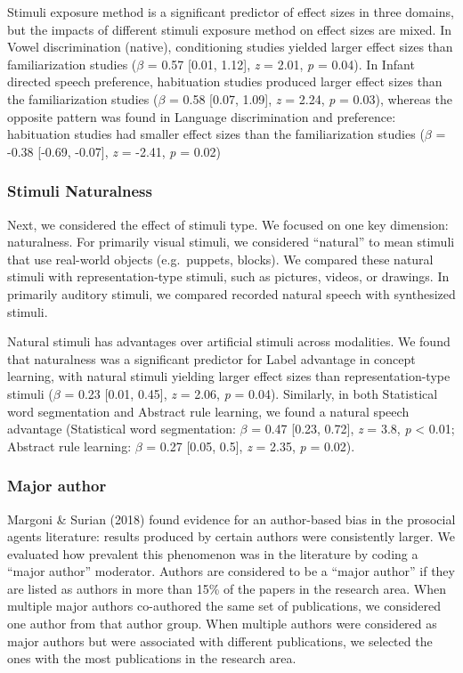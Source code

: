 \documentclass[10pt, letterpaper]{article}
\begin{document}
Stimuli exposure method is a significant predictor of effect sizes in
three domains, but the impacts of different stimuli exposure method on
effect sizes are mixed. In Vowel discrimination (native), conditioning
studies yielded larger effect sizes than familiarization studies
(\(\beta\) = 0.57 {[}0.01, 1.12{]}, \emph{z} = 2.01, \emph{p} = 0.04).
In Infant directed speech preference, habituation studies produced
larger effect sizes than the familiarization studies (\(\beta\) = 0.58
{[}0.07, 1.09{]}, \emph{z} = 2.24, \emph{p} = 0.03), whereas the
opposite pattern was found in Language discrimination and preference:
habituation studies had smaller effect sizes than the familiarization
studies (\(\beta\) = -0.38 {[}-0.69, -0.07{]}, \emph{z} = -2.41,
\emph{p} = 0.02)

\hypertarget{stimuli-naturalness}{%
\subsubsection{Stimuli Naturalness}\label{stimuli-naturalness}}

Next, we considered the effect of stimuli type. We focused on one key
dimension: naturalness. For primarily visual stimuli, we considered
``natural'' to mean stimuli that use real-world objects (e.g.~puppets,
blocks). We compared these natural stimuli with representation-type
stimuli, such as pictures, videos, or drawings. In primarily auditory
stimuli, we compared recorded natural speech with synthesized stimuli.

Natural stimuli has advantages over artificial stimuli across
modalities. We found that naturalness was a significant predictor for
Label advantage in concept learning, with natural stimuli yielding
larger effect sizes than representation-type stimuli (\(\beta\) = 0.23
{[}0.01, 0.45{]}, \emph{z} = 2.06, \emph{p} = 0.04). Similarly, in both
Statistical word segmentation and Abstract rule learning, we found a
natural speech advantage (Statistical word segmentation: \(\beta\) =
0.47 {[}0.23, 0.72{]}, \emph{z} = 3.8, \emph{p} \textless{} 0.01;
Abstract rule learning: \(\beta\) = 0.27 {[}0.05, 0.5{]}, \emph{z} =
2.35, \emph{p} = 0.02).

\hypertarget{major-author}{%
\subsubsection{Major author}\label{major-author}}

Margoni \& Surian (2018) found evidence for an author-based bias in the
prosocial agents literature: results produced by certain authors were
consistently larger. We evaluated how prevalent this phenomenon was in
the literature by coding a ``major author'' moderator. Authors are
considered to be a ``major author'' if they are listed as authors in
more than 15\% of the papers in the research area. When multiple major
authors co-authored the same set of publications, we considered one
author from that author group. When multiple authors were considered as
major authors but were associated with different publications, we
selected the ones with the most publications in the research area.
\end{document}
